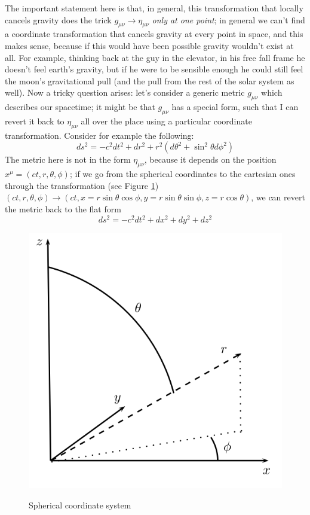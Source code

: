 \documentclass[11pt, a4paper,oneside,openright]{book}
\numberwithin{equation}{section}
\begin{document}
The important statement here is that, in general, this transformation that locally cancels gravity does the trick $g_{\mu\nu}\rightarrow \eta_{\mu\nu}$ \textit{only at one point}; in general we can't find a coordinate transformation that cancels gravity at every point in space, and this makes sense, because if this would have been possible gravity wouldn't exist at all. For example, thinking back at the guy in the elevator, in his free fall frame he doesn't feel earth's gravity, but if he were to be sensible enough he could still feel the moon's gravitational pull (and the pull from the rest of the solar system as well). Now a tricky question arises: let's consider a generic metric $g_{\mu\nu}$ which describes our spacetime; it might be that $g_{\mu\nu}$ has a special form, such that I can revert it back to $\eta_{\mu\nu}$ all over the place using a particular coordinate transformation. Consider for example the following: 
\begin{equation}
\label{metspher}
ds^2=-c^2dt^2+dr^2+r^2(d\theta^2+\sin^2{\theta}d\phi^2)
\end{equation}
The metric here is not in the form $\eta_{\mu\nu}$, because it depends on the position $x^\mu=(ct,r,\theta,\phi)$; if we go from the spherical coordinates to the cartesian ones through the transformation (see Figure \ref{coordinates}) $(ct,r,\theta,\phi)\rightarrow(ct,x=r\sin{\theta}\cos{\phi},y=r\sin{\theta}\sin{\phi},z=r\cos{\theta})$, we can revert the metric back to the flat form 
\begin{equation}
ds^2=-c^2dt^2+dx^2+dy^2+dz^2
\end{equation}
\begin{figure}
\begin{center}
\includegraphics[scale=0.7]{Draw/coordinates.png}
\label{}
\end{center}
\caption{Spherical coordinate system}
\label{coordinates}
\end{figure}
\end{document}
